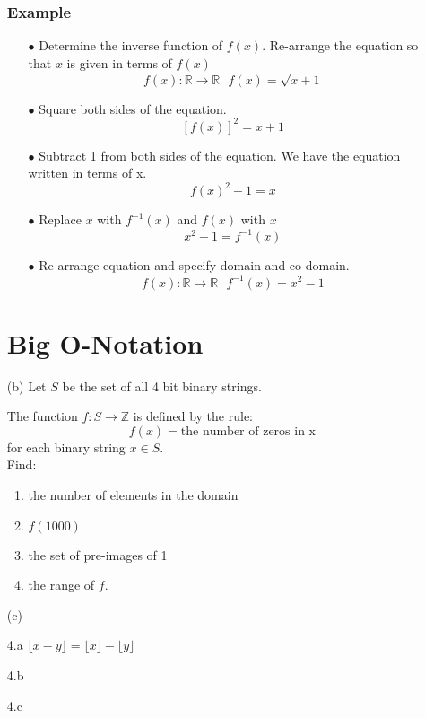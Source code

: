 \documentclass[a4paper,12pt]{article}
\begin{document}
\begin{itemize}
\subsubsection{Example}
\begin{itemize}
\item[$\bullet$]Determine the inverse function of $f(x)$. Re-arrange the equation so that $x$ is given in terms of $f(x)$
\[  f(x): \mathbb{R} \rightarrow \mathbb{R}  \mbox{   } f(x)  = \sqrt{x+1} \]
\item[$\bullet$] Square both sides of the equation.
\[[f(x)]^2 = x+1 \]
\item[$\bullet$] Subtract 1 from both sides of the equation. We have the equation written in terms of x.
\[f(x)^2-1 = x \]
\item[$\bullet$] Replace $x$ with $f^{-1}(x)$ and $f(x)$ with $x$
\[x^2-1 = f^{-1}(x) \]
\item[$\bullet$] 
Re-arrange equation and specify domain and co-domain.
\[ f(x): \mathbb{R} \rightarrow \mathbb{R}  \mbox{   }  f^{-1}(x) = x^2-1  \]
\end{itemize}
\newpage
\section{Big O-Notation}


\item[(b)] Let $S$ be the set of all 4 bit binary strings. 

The function $f : S \rightarrow \mathbb{Z}$
is defined by the rule:
\[f(x) = \mbox{the number of zeros in x}\]
for each binary string $x \in S$.\\
Find:
\begin{enumerate}
\item the number of elements in the domain
\item $f(1000)$
\item the set of pre-images of 1
\item the range of $f$.
\end{enumerate}
\item[(c)]
\end{itemize}
\newpage
\begin{itemize}
\item[4.a] $ \lfloor x - y \rfloor = \lfloor x \rfloor - \lfloor y \rfloor$
\item[4.b]
\item[4.c]
\end{itemize}
\newpage
\end{document}

